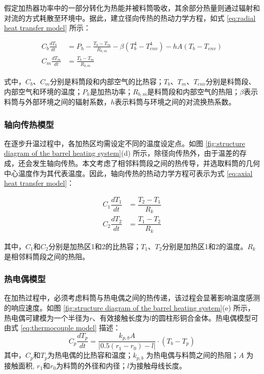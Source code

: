 假定加热器功率中的一部分转化为热能并被料筒吸收，其余部分热量则通过辐射和对流的方式耗散至环境中。据此，建立径向传热的热动力学方程，如式 \ref{eq:radial heat transfer model} 所示：\par

\begin{equation}
    \begin{aligned}
        C_{b}\frac{d T_{b}}{d t}&=P_{h}-\frac{T_{b}-T_{m}}{R_{b, m}}-\beta(T^4_b-T^4_{env})-hA(T_b-T_{env}) \\
        C_{m} \frac{d T_{m}}{d t}&=\frac{T_{b}-T_{m}}{R_{b, m}}
    \end{aligned}
    \label{eq:radial heat transfer model}
\end{equation}

式中，$C_b$、$C_m$分别是料筒段和内部空气的比热容；$T_b$、$T_m$、$T_{env}$分别是料筒段、内部空气和环境的温度；$P_h$是加热功率；$R_{b, m}$是料筒段和内部空气的热阻；$\beta$表示料筒与外部环境之间的辐射系数，$h$表示料筒与环境之间的对流换热系数。\par

\subsubsection{轴向传热模型}
在逐步升温过程中，各加热区均需设定不同的温度设定点。如图 \ref{fig:structure diagram of the barrel heating system}(d) 所示，除径向传热外，由于温差的存成，还会发生轴向传热。本文考虑了相邻料筒段之间的热传导，并选取料筒的几何中心温度作为其代表温度。因此，轴向传热的热动力学方程可表示为式 \ref{eq:axial heat transfer model}：\par

\begin{equation}
    \begin{array}{cc}
        C_1\dfrac{dT_1}{dt}&=\dfrac{T_2-T_1}{R_k}\\ 
        C_2\dfrac{dT_2}{dt}&=\dfrac{T_1-T_2}{R_k}
    \end{array}
    \label{eq:axial heat transfer model}
\end{equation}

其中，$C_1$和$C_2$分别是加热区1和2的比热容；$T_1$、$T_2$分别是加热区1和2的温度。$R_k$是相邻料筒段之间的热阻。\par

\subsubsection{热电偶模型}
在加热过程中，必须考虑料筒与热电偶之间的热传递，该过程会显著影响温度感测的响应速度。如图 \ref{fig:structure diagram of the barrel heating system}(e) 所示，热电偶可建模为一个半径为$r$、有效接触长度为$l$的圆柱形铜合金体。热电偶模型可由式 \ref{eq:thermocouple model} 描述：
\begin{equation}
    C_p\frac{d T_p}{d t}=\frac{k_{p,b}A}{|0.5(r_1-r_0)-l|}\cdot(T_{b}-T_p)
    \label{eq:thermocouple model}
\end{equation}
其中，$C_p$和$T_p$为热电偶的比热容和温度；$k_{p,b}$ 为热电偶与料筒之间的热阻；$A$ 为接触面积, $r_1$和$r_0$为料筒的外径和内径；$l$为接触母线长度。\par


